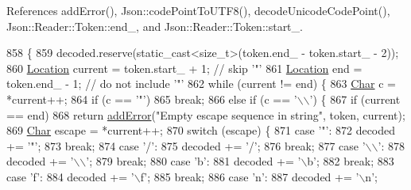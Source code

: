 References add\+Error(), Json\+::code\+Point\+To\+U\+T\+F8(), decode\+Unicode\+Code\+Point(), Json\+::\+Reader\+::\+Token\+::end\+\_\+, and Json\+::\+Reader\+::\+Token\+::start\+\_\+.


\begin{DoxyCode}
858                                                                \{
859   decoded.reserve(static\_cast<size\_t>(token.end\_ - token.start\_ - 2));
860   \hyperlink{class_json_1_1_reader_a46795b5b272bf79a7730e406cb96375a}{Location} current = token.start\_ + 1; \textcolor{comment}{// skip '"'}
861   \hyperlink{class_json_1_1_reader_a46795b5b272bf79a7730e406cb96375a}{Location} end = token.end\_ - 1;       \textcolor{comment}{// do not include '"'}
862   \textcolor{keywordflow}{while} (current != end) \{
863     \hyperlink{class_json_1_1_reader_a3eec9118f3e9a672ba8348c3a79d0f45}{Char} c = *current++;
864     \textcolor{keywordflow}{if} (c == \textcolor{charliteral}{'"'})
865       \textcolor{keywordflow}{break};
866     \textcolor{keywordflow}{else} \textcolor{keywordflow}{if} (c == \textcolor{charliteral}{'\(\backslash\)\(\backslash\)'}) \{
867       \textcolor{keywordflow}{if} (current == end)
868         \textcolor{keywordflow}{return} \hyperlink{class_json_1_1_reader_af02176a1d2786b4415bbb00a1b10bb6b}{addError}(\textcolor{stringliteral}{"Empty escape sequence in string"}, token, current);
869       \hyperlink{class_json_1_1_reader_a3eec9118f3e9a672ba8348c3a79d0f45}{Char} escape = *current++;
870       \textcolor{keywordflow}{switch} (escape) \{
871       \textcolor{keywordflow}{case} \textcolor{charliteral}{'"'}:
872         decoded += \textcolor{charliteral}{'"'};
873         \textcolor{keywordflow}{break};
874       \textcolor{keywordflow}{case} \textcolor{charliteral}{'/'}:
875         decoded += \textcolor{charliteral}{'/'};
876         \textcolor{keywordflow}{break};
877       \textcolor{keywordflow}{case} \textcolor{charliteral}{'\(\backslash\)\(\backslash\)'}:
878         decoded += \textcolor{charliteral}{'\(\backslash\)\(\backslash\)'};
879         \textcolor{keywordflow}{break};
880       \textcolor{keywordflow}{case} \textcolor{charliteral}{'b'}:
881         decoded += \textcolor{charliteral}{'\(\backslash\)b'};
882         \textcolor{keywordflow}{break};
883       \textcolor{keywordflow}{case} \textcolor{charliteral}{'f'}:
884         decoded += \textcolor{charliteral}{'\(\backslash\)f'};
885         \textcolor{keywordflow}{break};
886       \textcolor{keywordflow}{case} \textcolor{charliteral}{'n'}:
887         decoded += \textcolor{charliteral}{'\(\backslash\)n'};

\end{DoxyCode}
